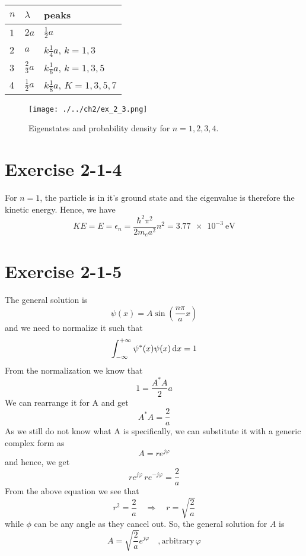 \begin{table}[h]
	\centering
	\begin{tabular}{l l l}
		\hline
		$n$	& $\lambda$			& peaks							\\
		\hline
		1 	& $2a$ 				& $\frac{1}{2}a$ 				\\
		2 	& $a$ 				& $k \frac{1}{4}a$, $k=1,3$ 	\\
		3 	& $\frac{2}{3}a$  	& $k \frac{1}{6}a$, $k=1,3,5$ 	\\
		4 	& $\frac{1}{2}a$  	& $k \frac{1}{8}a$, $K=1,3,5,7$	\\
		\hline
	\end{tabular}
\end{table}

\begin{figure}
	\centering
	\texttt{[image: ./../ch2/ex\_2\_3.png]}
	\caption{Eigenstates and probability density for $n={1,2,3,4}$.}
	\label{fig:ch02_ex_2_3.png}
\end{figure}

\section{Exercise 2-1-4}
For $n=1$, the particle is in it's ground state and the eigenvalue is
therefore the kinetic energy. Hence, we have
\[
	KE
	= E
	= \epsilon_n
	= \frac{\hbar^2 \pi^2}{2 m_e a^2} n^2
	= \SI{3.77e-3}{\eV}
\]

\section{Exercise 2-1-5}
The general solution is
\[
	\psi(x) = A \sin\left(\frac{n \pi}{a} x\right)
\]
and we need to normalize it such that
\[
	\int_{-\infty}^{+\infty} \psi^{\ast}(x) \psi(x) \dif x = 1
\]
From the normalization we know that
\[
	1 = \frac{A^{\ast}A}{2} a
\]
We can rearrange it for A and get
\[
	A^\ast A = \frac{2}{a}
\]
As we still do not know what A is specifically, we can substitute it with a generic complex form as
\[
	A = r e^{j \varphi}
\]
and hence, we get
\[
	r e^{j \varphi} \, r e^{- j \varphi} = \frac{2}{a}
\]
From the above equation we see that
\[
	r^2 = \frac{2}{a} \quad \Rightarrow \quad r = \sqrt{\frac{2}{a}}
\]
while $\phi$ can be any angle as they cancel out. So, the general solution for $A$ is
\[
	A = \sqrt{\frac{2}{a}} e^{j \varphi} \quad, \mathrm{arbitrary } \, \varphi
\]